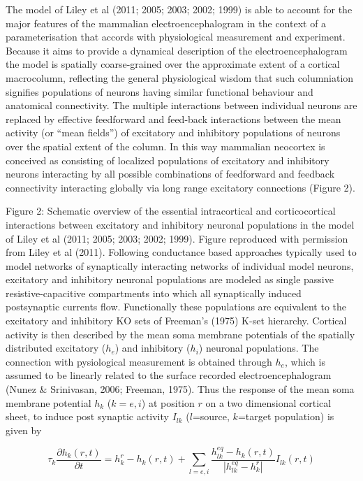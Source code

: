 \documentclass[a4paper,12pt]{article}
\begin{document}
The model of Liley et al (2011; 2005; 2003; 2002; 1999) is able to
account for the major features of the mammalian
electroencephalogram in the context of a parameterisation that
accords with physiological measurement and experiment. Because it
aims to provide a dynamical description of the electroencephalogram
the model is spatially coarse-grained over the approximate extent of a
cortical macrocolumn, reflecting the general physiological wisdom that
such columniation signifies populations of neurons having similar
functional behaviour and anatomical connectivity. The multiple
interactions between individual neurons are replaced by effective feedforward
and feed-back interactions between the mean activity (or
“mean fields”) of excitatory and inhibitory populations of neurons over
the spatial extent of the column. In this way mammalian neocortex is
conceived as consisting of localized populations of excitatory and
inhibitory neurons interacting by all possible combinations of
feedforward and feedback connectivity interacting globally via long
range excitatory connections (Figure 2).

Figure 2: Schematic overview of the essential intracortical and corticocortical
interactions between excitatory and inhibitory neuronal
populations in the model of Liley et al (2011; 2005; 2003; 2002;
1999). Figure reproduced with permission from Liley et al (2011).
Following conductance based approaches typically used to model
networks of synaptically interacting networks of individual model
neurons, excitatory and inhibitory neuronal populations are modeled as
single passive resistive-capacitive compartments into which all
synaptically induced postsynaptic currents flow. Functionally these
populations are equivalent to the excitatory and inhibitory KO sets of
Freeman’s (1975) K-set hierarchy. Cortical activity is then described
by the mean soma membrane potentials of the spatially distributed excitatory ($h_e$)
and inhibitory ($h_i$) neuronal populations. The connection with pysiological measurement is obtained through $h_e$, which is
assumed to be linearly related to the surface recorded
electroencephalogram (Nunez \& Srinivasan, 2006; Freeman, 1975).
Thus the response of the mean soma membrane potential $h_k$ ($k=e,i$) at position $r$ on a two dimensional cortical sheet, to induce post synaptic activity $I_{lk}$ ($l$=source, $k$=target population) is given by

\begin{equation} \label{eq:h_k} 
\tau_k\frac{\partial h_k(r,t)}{\partial t} = h^r_k - h_k(r,t) + \sum_{l=e,i} \frac{h_{lk}^{eq} - h_k(r, t)}{\left| h_{lk}^{eq}-h_k^r\right|}I_{lk}(r,t) 
\end{equation}
\end{document}
